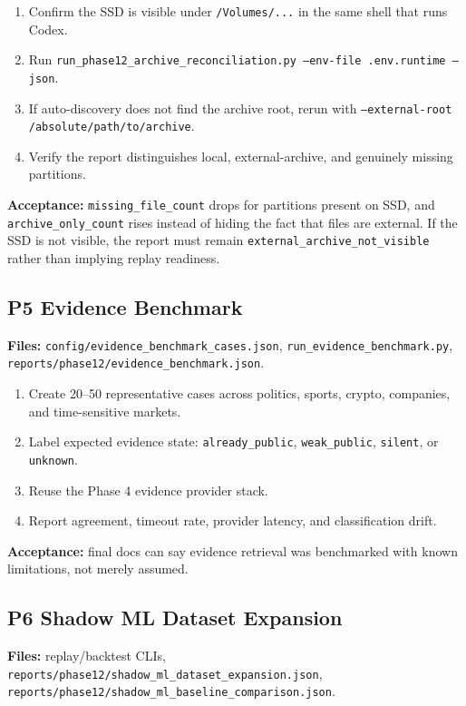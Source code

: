 \documentclass{article}
\begin{document}
\begin{enumerate}[nosep]
\item Confirm the SSD is visible under \texttt{/Volumes/...} in the same shell that runs Codex.
\item Run \texttt{run\_phase12\_archive\_reconciliation.py --env-file .env.runtime --json}.
\item If auto-discovery does not find the archive root, rerun with \texttt{--external-root /absolute/path/to/archive}.
\item Verify the report distinguishes local, external-archive, and genuinely missing partitions.
\end{enumerate}

\textbf{Acceptance:} \texttt{missing\_file\_count} drops for partitions present on SSD, and \texttt{archive\_only\_count} rises instead of hiding the fact that files are external. If the SSD is not visible, the report must remain \texttt{external\_archive\_not\_visible} rather than implying replay readiness.

\subsection*{P5 Evidence Benchmark}
\textbf{Files:} \texttt{config/evidence\_benchmark\_cases.json}, \texttt{run\_evidence\_benchmark.py}, \texttt{reports/phase12/evidence\_benchmark.json}.

\begin{enumerate}[nosep]
\item Create 20--50 representative cases across politics, sports, crypto, companies, and time-sensitive markets.
\item Label expected evidence state: \texttt{already\_public}, \texttt{weak\_public}, \texttt{silent}, or \texttt{unknown}.
\item Reuse the Phase 4 evidence provider stack.
\item Report agreement, timeout rate, provider latency, and classification drift.
\end{enumerate}

\textbf{Acceptance:} final docs can say evidence retrieval was benchmarked with known limitations, not merely assumed.

\subsection*{P6 Shadow ML Dataset Expansion}
\textbf{Files:} replay/backtest CLIs, \texttt{reports/phase12/shadow\_ml\_dataset\_expansion.json}, \texttt{reports/phase12/shadow\_ml\_baseline\_comparison.json}.
\end{document}
